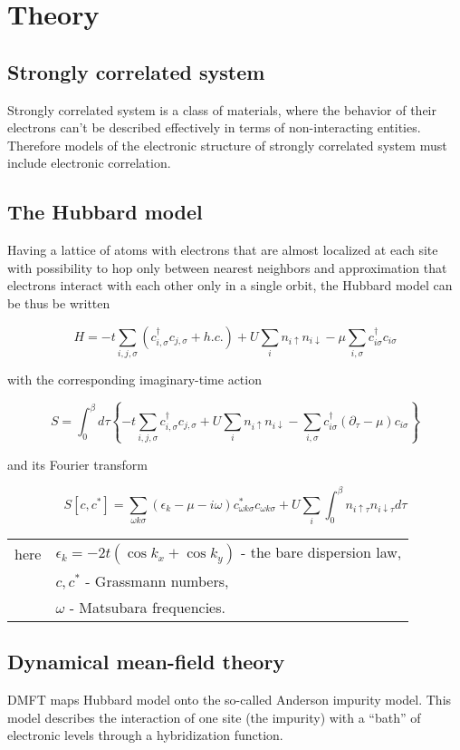 \section{Theory}
\subsection{Strongly correlated system}
Strongly correlated system is a class of materials, where the behavior of their electrons can't be 
described effectively in terms of non-interacting entities. Therefore models of the electronic
structure of strongly correlated system must include electronic correlation.

\subsection{The Hubbard model}
Having a lattice of atoms with electrons that are almost localized at each site with possibility to hop
only between nearest neighbors and approximation that electrons interact with each other only in a single orbit, 
the Hubbard model can be thus be written

\[ H = -t \sum_{i,j,\sigma}(c_{i,\sigma}^\dagger c_{j,\sigma} + h.c.)+ U\sum_i n_{i\uparrow}n_{i\downarrow} - \mu\sum_{i,\sigma}c_{i\sigma}^\dagger c_{i\sigma} \]

with the corresponding imaginary-time action

\[ S = \int_0^\beta d\tau \left\{
  -t \sum_{i,j,\sigma}c_{i,\sigma}^\dagger c_{j,\sigma} + U\sum_i n_{i\uparrow}n_{i\downarrow} - \sum_{i,\sigma}c_{i\sigma}^\dagger (\partial_\tau-\mu) c_{i\sigma} \right\} \]

and its Fourier transform

\[ S[c,c^*] = \sum_{\omega k \sigma}(\epsilon_k-\mu-i\omega)c_{\omega k \sigma}^* c_{\omega k \sigma} + U\sum_i\int_0^\beta n_{i\uparrow\tau}n_{i\downarrow\tau} d\tau \]
 
\begin{tabular}{rl}
  here & $\epsilon_k = -2t(\cos{k_x}+\cos{k_y})$ - the bare dispersion law, \\
  & $c,c^*$ - Grassmann numbers, \\
  & $\omega$ - Matsubara frequencies.
\end{tabular}

\subsection{Dynamical mean-field theory}
DMFT maps Hubbard model onto the so-called Anderson impurity model.
This model describes the interaction of one site (the impurity) 
with a ``bath'' of electronic levels through a hybridization function. 

